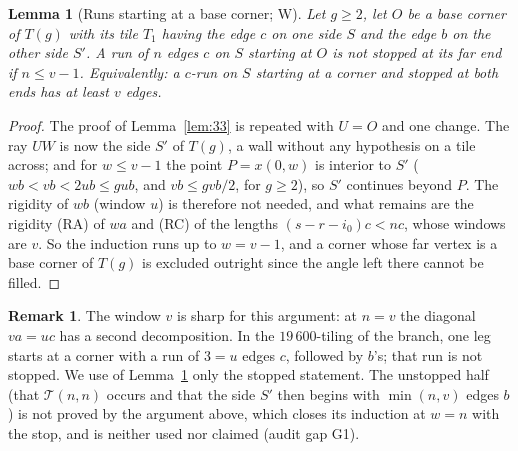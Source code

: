 \documentclass[11pt,reqno]{amsart}
\theoremstyle{plain}
\newtheorem{lemma}[theorem]{Lemma}
\theoremstyle{definition}
\newtheorem{remark}[theorem]{Remark}
\newcommand{\sW}{\textup{\textsf{W}}}
\begin{document}
\begin{lemma}[Runs starting at a base corner; \sW]\label{lem:K}
Let $g\ge2$, let $O$ be a base corner of $T(g)$ with its tile $T_1$ having the edge $c$ on one side $S$ and the edge $b$ on the other side $S'$.
A run of $n$ edges $c$ on $S$ starting at $O$ is not stopped at its far end if $n\le v-1$. Equivalently: a $c$-run on $S$ starting at a corner and stopped at both ends
has at least $v$ edges.
\end{lemma}
\begin{proof}
The proof of Lemma~\ref{lem:33} is repeated with $U=O$ and one change. The ray $UW$ is now the side $S'$ of
$T(g)$, a wall without any hypothesis on a tile across; and for $w\le v-1$ the point $P=x(0,w)$ is interior to $S'$ ($wb<vb<2ub\le gub$, and $vb\le gvb/2$, for $g\ge2$), so $S'$
continues beyond $P$. The rigidity of $wb$ (window $u$) is therefore not needed, and what remains are the rigidity (RA) of $wa$ and (RC) of the lengths $(s-r-i_0)c<nc$, whose windows are $v$.
So the induction runs up to $w=v-1$, and a corner whose far vertex is a base corner of $T(g)$ is excluded outright since the angle left there cannot be filled.
\end{proof}
\begin{remark}
The window $v$ is sharp for this argument: at $n=v$ the diagonal $va=uc$ has a second decomposition. In the $19\,600$-tiling of the branch, one leg starts at a
corner with a run of $3=u$ edges $c$, followed by $b$'s; that run is not stopped. We use of Lemma~\ref{lem:K} only the stopped statement. The unstopped half
(that $\mathcal T(n,n)$ occurs and that the side $S'$ then begins with $\min(n,v)$ edges $b$) is not proved by the argument above, which closes its induction
at $w=n$ with the stop, and is neither used nor claimed (audit gap G1).
\end{remark}
\end{document}
